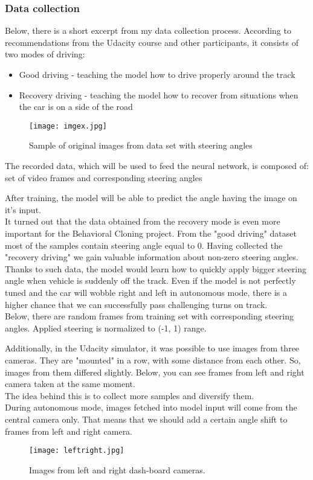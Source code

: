 \subsubsection{Data collection}
Below, there is a short excerpt from my data collection process. According to recommendations from the Udacity course and other participants, it consists of two modes of driving:
\begin{itemize}
	\item Good driving - teaching the model how to drive properly around the track
	\item Recovery driving - teaching the model how to recover from situations when the car is on a side of the road
\end{itemize}


\begin{figure}[H]
	\centering
	\texttt{[image: imgex.jpg]}
	\caption{Sample of original images from data set with steering angles}
\end{figure}

The recorded data, which will be used to feed the neural network, is composed of:
set of video frames and corresponding steering angles

After training, the model will be able to predict the angle having the image on it's input.\\
It turned out that the data obtained from the recovery mode is even more important for the Behavioral Cloning project. From the "good driving" dataset most of the samples contain steering angle equal to 0. Having collected the "recovery driving" we gain valuable information about non-zero steering angles. Thanks to such data, the model would learn how to quickly apply bigger steering angle when vehicle is suddenly off the track. Even if the model is not perfectly tuned and the car will wobble right and left in autonomous mode, there is a higher chance that we can successfully pass challenging turns on track.\\
Below, there are random frames from training set with corresponding steering angles. Applied steering is normalized to (-1, 1) range.


Additionally, in the Udacity simulator, it was possible to use images from three cameras. They are "mounted" in a row, with some distance from each other. So, images from them differed slightly. Below, you can see frames from left and right camera taken at the same moment.\\ The idea behind this is to collect more samples and diversify them.\\ During autonomous mode, images fetched into model input will come from the central camera only. That means that we should add a certain angle shift to frames from left and right camera.
\begin{figure}[H]
	\centering
	\texttt{[image: leftright.jpg]}
	\caption{Images from left and right dash-board cameras.}
\end{figure}



